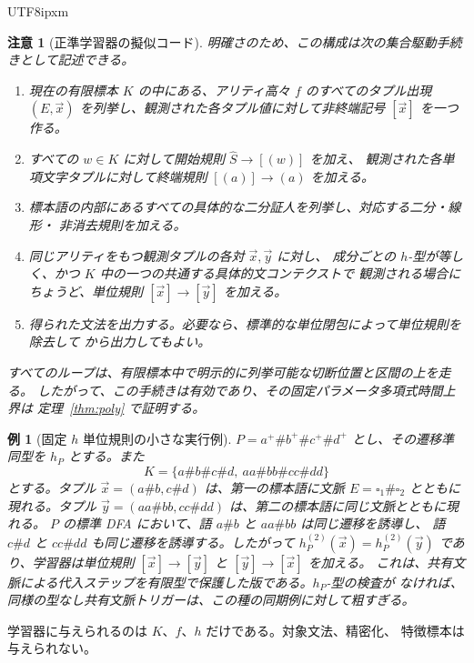 \documentclass[10pt,a4paper]{article}
\newtheorem{remark}[theorem]{注意}
\newtheorem{example}[theorem]{例}
\theoremstyle{remark}
\newcommand{\tuple}[1]{\vec{#1}}
\newcommand{\blank}{\square}
\begin{document}
\begin{CJK}{UTF8}{ipxm}
\begin{remark}[正準学習器の擬似コード]
\label{rem:learner-pseudocode}
明確さのため、この構成は次の集合駆動手続きとして記述できる。
\begin{enumerate}[label=\textnormal{手順 \arabic*.},leftmargin=*]
\item 現在の有限標本 \(K\) の中にある、アリティ高々 \(f\) のすべてのタプル出現
\((E,\tuple x)\) を列挙し、観測された各タプル値に対して非終端記号
\([\tuple x]\) を一つ作る。
\item すべての \(w\in K\) に対して開始規則 \(\widehat S\to[(w)]\) を加え、
観測された各単項文字タプルに対して終端規則 \([(a)]\to(a)\) を加える。
\item 標本語の内部にあるすべての具体的な二分証人を列挙し、対応する二分・線形・
非消去規則を加える。
\item 同じアリティをもつ観測タプルの各対 \(\tuple x,\tuple y\) に対し、
成分ごとの \(h\)-型が等しく、かつ \(K\) 中の一つの共通する具体的文コンテクストで
観測される場合にちょうど、単位規則 \([\tuple x]\to[\tuple y]\) を加える。
\item 得られた文法を出力する。必要なら、標準的な単位閉包によって単位規則を除去して
から出力してもよい。
\end{enumerate}
すべてのループは、有限標本中で明示的に列挙可能な切断位置と区間の上を走る。
したがって、この手続きは有効であり、その固定パラメータ多項式時間上界は
定理~\ref{thm:poly} で証明する。
\end{remark}

\begin{example}[固定 \(h\) 単位規則の小さな実行例]
\label{ex:learner-trace}
\(P=a^+\#b^+\#c^+\#d^+\) とし、その遷移準同型を \(h_P\) とする。また
\[
  K=\{a\#b\#c\#d,\ aa\#bb\#cc\#dd\}
\]
とする。タプル \(\tuple x=(a\#b,c\#d)\) は、第一の標本語に文脈
\(E=\blank_1\#\blank_2\) とともに現れる。タプル
\(\tuple y=(aa\#bb,cc\#dd)\) は、第二の標本語に同じ文脈とともに現れる。
\(P\) の標準 DFA において、語 \(a\#b\) と \(aa\#bb\) は同じ遷移を誘導し、
語 \(c\#d\) と \(cc\#dd\) も同じ遷移を誘導する。したがって
\(h_P^{(2)}(\tuple x)=h_P^{(2)}(\tuple y)\) であり、学習器は単位規則
\([\tuple x]\to[\tuple y]\) と \([\tuple y]\to[\tuple x]\) を加える。
これは、共有文脈による代入ステップを有限型で保護した版である。\(h_P\)-型の検査が
なければ、同様の型なし共有文脈トリガーは、この種の同期例に対して粗すぎる。
\end{example}

学習器に与えられるのは \(K\)、\(f\)、\(h\) だけである。対象文法、精密化、
特徴標本は与えられない。


\end{CJK}
\end{document}
